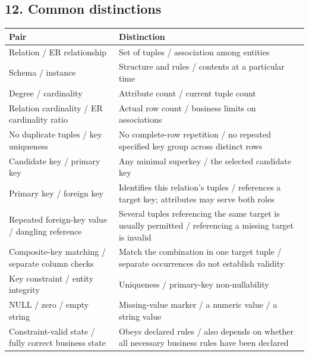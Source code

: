 \subsection{12. Common distinctions}\label{03_relational_model_and_integrity_en-common-distinctions}

\begin{longtable}[]{@{}
  >{\raggedright\arraybackslash}p{}
  >{\raggedright\arraybackslash}p{}@{}}
\toprule\noalign{}
\begin{minipage}[b]{\linewidth}\raggedright
Pair
\end{minipage} & \begin{minipage}[b]{\linewidth}\raggedright
Distinction
\end{minipage} \\
\midrule\noalign{}
\endhead
\bottomrule\noalign{}
\endlastfoot
Relation / ER relationship & Set of tuples / association among entities \\
Schema / instance & Structure and rules / contents at a particular time \\
Degree / cardinality & Attribute count / current tuple count \\
Relation cardinality / ER cardinality ratio & Actual row count / business limits on associations \\
No duplicate tuples / key uniqueness & No complete-row repetition / no repeated specified key group across distinct rows \\
Candidate key / primary key & Any minimal superkey / the selected candidate key \\
Primary key / foreign key & Identifies this relation's tuples / references a target key; attributes may serve both roles \\
Repeated foreign-key value / dangling reference & Several tuples referencing the same target is usually permitted / referencing a missing target is invalid \\
Composite-key matching / separate column checks & Match the combination in one target tuple / separate occurrences do not establish validity \\
Key constraint / entity integrity & Uniqueness / primary-key non-nullability \\
NULL / zero / empty string & Missing-value marker / a numeric value / a string value \\
Constraint-valid state / fully correct business state & Obeys declared rules / also depends on whether all necessary business rules have been declared \\
\end{longtable}

